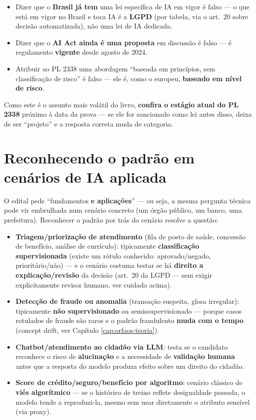 \begin{cuidado}
\begin{itemize}
\item Dizer que o \textbf{Brasil já tem} uma lei específica de IA em
vigor é falso --- o que está em vigor no Brasil e toca IA é a
\textbf{LGPD} (por tabela, via o art.\ 20 sobre decisão automatizada), não
uma lei de IA dedicada.
\item Dizer que o \textbf{AI Act ainda é uma proposta} em discussão é
falso --- é regulamento \textbf{vigente} desde agosto de 2024.
\item Atribuir ao PL 2338 uma abordagem “baseada em princípios, sem
classificação de risco” é falso --- ele é, como o europeu,
\textbf{baseado em nível de risco}.
\end{itemize}
Como este é o assunto mais volátil do livro, \textbf{confira o estágio
atual do PL 2338} próximo à data da prova --- se ele for sancionado como
lei antes disso, deixa de ser “projeto” e a resposta correta muda de
categoria.
\end{cuidado}

\section{Reconhecendo o padrão em cenários de IA aplicada}

\begin{conceito}
O edital pede “fundamentos \textbf{e aplicações}” --- ou seja, a mesma
pergunta técnica pode vir embrulhada num cenário concreto (um órgão
público, um banco, uma prefeitura). Reconhecer o padrão por trás do
cenário resolve a questão:

\begin{itemize}
\item \textbf{Triagem/priorização de atendimento} (fila de posto de
saúde, concessão de benefício, análise de currículo): tipicamente
\textbf{classificação supervisionada} (existe um rótulo conhecido:
aprovado/negado, prioritário/não) --- e o cenário costuma testar se há
\textbf{direito a explicação/revisão} da decisão (art.\ 20 da LGPD --- sem
exigir explicitamente revisor humano, ver cuidado acima).
\item \textbf{Detecção de fraude ou anomalia} (transação suspeita, glosa
irregular): tipicamente \textbf{não supervisionado} ou semissupervisionado
--- porque casos rotulados de fraude são raros e o padrão fraudulento
\textbf{muda com o tempo} (concept drift, ver Capítulo
\ref{cap:orfaos-teoria}).
\item \textbf{Chatbot/atendimento ao cidadão via LLM}: testa se o
candidato reconhece o risco de \textbf{alucinação} e a necessidade de
\textbf{validação humana} antes que a resposta do modelo produza efeito
sobre um direito do cidadão.
\item \textbf{Score de crédito/seguro/benefício por algoritmo}: cenário
clássico de \textbf{viés algorítmico} --- se o histórico de treino
reflete desigualdade passada, o modelo tende a reproduzi-la, mesmo sem
usar diretamente o atributo sensível (via proxy).
\end{itemize}
\end{conceito}

